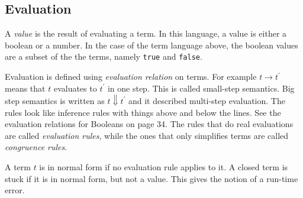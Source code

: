 \documentclass[]{article}
\begin{document}
\subsection*{Evaluation}
A \emph{value} is the result of evaluating a term. In this language, a value is either a boolean or a number. In the case of the term language above, the boolean values are a subset of the the terms, namely \verb|true| and \verb|false|. 

Evaluation is defined using \emph{evaluation relation} on terms. For example $ t \rightarrow t^\prime$ means that $t$ evaluates to $ t^\prime$ in one step. This is called small-step semantics. Big step semantics is written as $t \Downarrow t^\prime$ and it described multi-step evaluation. The rules look like inference rules with things above and below the lines. See the evaluation relations for Booleans on page 34. The rules that do real evaluations are called \emph{evaluation rules}, while the ones that only simplifies terms are called \emph{congruence rules}. 

A term $t$ is in normal form if no evaluation rule applies to it. A closed term is stuck if it is in normal form, but not a value. This gives the notion of a run-time error. 
\end{document}
